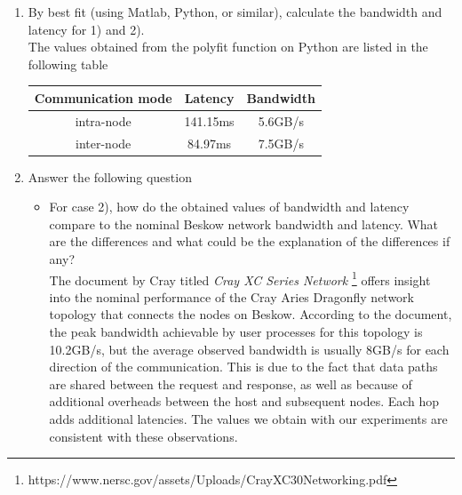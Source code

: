 \documentclass[12pt]{article}
\begin{document}
\begin{enumerate}
    \item By best fit (using Matlab, Python, or similar), calculate the bandwidth and latency for 1) and 2).\\
    The values obtained from the polyfit function on Python are listed in the following table
\begin{center}
\begin{tabular}{ |c|c|c| }
\hline
\textbf{Communication mode} & \textbf{Latency} & \textbf{Bandwidth} \\
\hline
intra-node & 141.15ms & 5.6GB/s \\
\hline
inter-node & 84.97ms & 7.5GB/s \\
\hline
\end{tabular}
\end{center}
    \item Answer the following question
    \begin{itemize}
        \item For case 2), how do the obtained values of bandwidth and latency compare to the nominal Beskow network bandwidth and latency. What are the differences and what could be the explanation of the differences if any?\\
        The document by Cray titled \textit{Cray XC \textregistered Series Network} \footnote{https://www.nersc.gov/assets/Uploads/CrayXC30Networking.pdf} offers insight into the nominal performance of the Cray Aries Dragonfly network topology that connects the nodes on Beskow. According to the document, the peak bandwidth achievable by user processes for this topology is 10.2GB/s, but the average observed bandwidth is usually 8GB/s for each direction of the communication. This is due to the fact that data paths are shared between the request and response, as well as because of additional overheads between the host and subsequent nodes. Each hop adds additional latencies. The values we obtain with our experiments are consistent with these observations.
    \end{itemize}
\end{enumerate}
\end{document}
